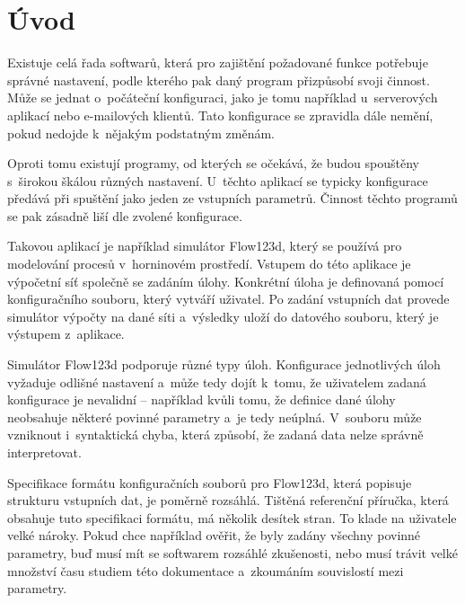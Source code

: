 \documentclass[FM,bw,DP]{tulthesis}
\begin{document}
\renewcommand\listfigurename{Seznam obrázků\vspace{-5pt}}
\listoffigures
\clearpage



\printnoidxglossary[type=\acronymtype,title=Seznam zkratek]


\chapter*{Úvod}

Existuje celá řada softwarů, která pro zajištění požadované funkce potřebuje správné nastavení, podle kterého pak daný program přizpůsobí svoji činnost. Může se jednat o~počáteční konfiguraci, jako je tomu například u~serverových aplikací nebo e-mailových klientů. Tato konfigurace se zpravidla dále nemění, pokud nedojde k~nějakým podstatným změnám.

Oproti tomu existují programy, od kterých se očekává, že budou spouštěny s~širokou škálou různých nastavení. U~těchto aplikací se typicky konfigurace předává při spuštění jako jeden ze vstupních parametrů. Činnost těchto programů se pak zásadně liší dle zvolené konfigurace.

Takovou aplikací je například simulátor Flow123d, který se používá pro modelování procesů v~horninovém prostředí. Vstupem do této aplikace je výpočetní síť společně se zadáním úlohy. Konkrétní úloha je definovaná pomocí konfiguračního souboru, který vytváří uživatel. Po zadání vstupních dat provede simulátor výpočty na dané síti a~výsledky uloží do datového souboru, který je výstupem z~aplikace.

Simulátor Flow123d podporuje různé typy úloh. Konfigurace jednotlivých úloh vyžaduje odlišné nastavení a~může tedy dojít k~tomu, že uživatelem zadaná konfigurace je nevalidní -- například kvůli tomu, že definice dané úlohy neobsahuje některé povinné parametry a~je tedy neúplná. V~souboru může vzniknout i~syntaktická chyba, která způsobí, že zadaná data nelze správně interpretovat.

Specifikace formátu konfiguračních souborů pro Flow123d, která popisuje strukturu vstupních dat, je poměrně rozsáhlá. Tištěná referenční příručka, která obsahuje tuto specifikaci formátu, má několik desítek stran. To klade na uživatele velké nároky. Pokud chce například ověřit, že byly zadány všechny povinné parametry, buď musí mít se softwarem rozsáhlé zkušenosti, nebo musí trávit velké množství času studiem této dokumentace a~zkoumáním souvislostí mezi parametry.
\end{document}
